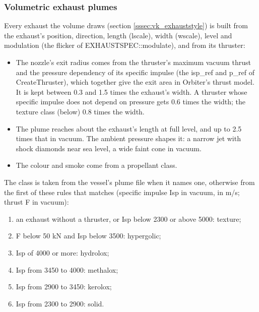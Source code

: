 \documentclass[Orbiter Developer Manual.tex]{subfiles}
\begin{document}
\begin{sloppypar}
\subsubsection{Volumetric exhaust plumes}
Every exhaust the volume draws (section \ref{sssec:vk_exhauststyle}) is built from the exhaust's position, direction, length (lscale), width (wscale), level and modulation (the flicker of EXHAUSTSPEC::modulate), and from its thruster:

\begin{itemize}
\item The nozzle's exit radius comes from the thruster's maximum vacuum thrust and the pressure dependency of its specific impulse (the isp\_ref and p\_ref of CreateThruster), which together give the exit area in Orbiter's thrust model. It is kept between 0.3 and 1.5 times the exhaust's width. A thruster whose specific impulse does not depend on pressure gets 0.6 times the width; the texture class (below) 0.8 times the width.
\item The plume reaches about the exhaust's length at full level, and up to 2.5 times that in vacuum. The ambient pressure shapes it: a narrow jet with shock diamonds near sea level, a wide faint cone in vacuum.
\item The colour and smoke come from a propellant class.
\end{itemize}

\noindent
The class is taken from the vessel's plume file when it names one, otherwise from the first of these rules that matches (specific impulse Isp in vacuum, in m/s; thrust F in vacuum):

\begin{enumerate}
\item an exhaust without a thruster, or Isp below 2300 or above 5000: texture;
\item F below 50 kN and Isp below 3500: hypergolic;
\item Isp of 4000 or more: hydrolox;
\item Isp from 3450 to 4000: methalox;
\item Isp from 2900 to 3450: kerolox;
\item Isp from 2300 to 2900: solid.
\end{enumerate}


\end{sloppypar}
\end{document}
